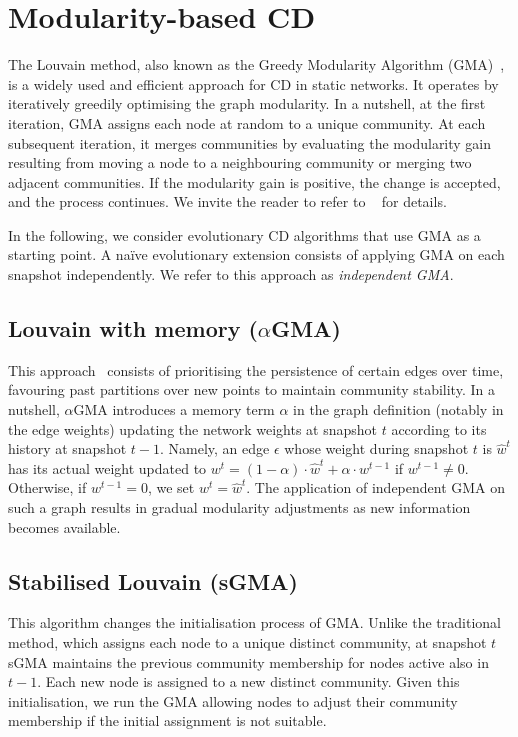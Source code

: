 \documentclass[letterpaper]{article}
\begin{document}
\section{Modularity-based CD}
\label{s:algorithms}

The Louvain method, also known as the Greedy Modularity Algorithm (GMA)~\cite{blondel2008louvain}, is a widely used and efficient approach for CD in static networks. It operates by iteratively greedily optimising the graph modularity. In a nutshell, at the first iteration, GMA assigns each node at random to a unique community. At each subsequent iteration, it merges communities by evaluating the modularity gain resulting from moving a node to a neighbouring community or merging two adjacent communities. If the modularity gain is positive, the change is accepted, and the process continues. We invite the reader to refer to ~\cite{blondel2008louvain} for details.

In the following, we consider evolutionary CD algorithms that use GMA as a starting point. A na\"ive evolutionary extension consists of applying GMA on each snapshot independently. We refer to this approach as \emph{independent GMA}. 

\subsection{Louvain with memory ($\alpha$GMA)} 
This approach~\cite{elegazzar2021alpha} consists of prioritising the persistence of certain edges over time, favouring past partitions over new points to maintain community stability.  In a nutshell, $\alpha$GMA introduces a memory term  $\alpha$ in the graph definition (notably in the edge weights) updating the network weights at snapshot $t$ according to its history at snapshot $t-1$.  
Namely, an edge $\epsilon$ whose weight during snapshot $t$ is  $\hat{w}^t$ has its actual weight updated to
{$w^t = (1-\alpha)\cdot \hat{w}^t + \alpha \cdot  w^{t-1}$} if $w^{t-1}\neq 0$. Otherwise, if $w^{t-1} = 0$, we set $w^t = \hat{w}^t$.   
The application of independent GMA on such a graph results in gradual modularity adjustments as new information becomes available.

\subsection{Stabilised Louvain (sGMA)} This algorithm changes the initialisation process of GMA. Unlike the traditional method, which assigns each node to a unique distinct community, at snapshot $t$ sGMA maintains the previous community membership for nodes active also in $t-1$. Each new node is assigned to a new distinct community. Given this initialisation, we run the GMA allowing nodes to adjust their community membership if the initial assignment is not suitable.
\end{document}
